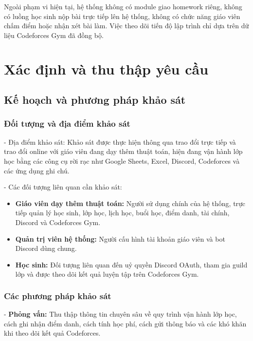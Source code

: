 \documentclass[12pt,a4paper]{article}
\begin{document}
Ngoài phạm vi hiện tại, hệ thống không có module giao homework riêng, không có luồng học sinh nộp bài trực tiếp lên hệ thống, không có chức năng giáo viên chấm điểm hoặc nhận xét bài làm. Việc theo dõi tiến độ lập trình chỉ dựa trên dữ liệu Codeforces Gym đã đồng bộ.

\section{Xác định và thu thập yêu cầu}

\subsection{Kế hoạch và phương pháp khảo sát}

\subsubsection{Đối tượng và địa điểm khảo sát}

- Địa điểm khảo sát: Khảo sát được thực hiện thông qua trao đổi trực tiếp và
trao đổi online với giáo viên đang dạy thêm thuật toán, hiện đang vận hành lớp
học bằng các công cụ rời rạc như Google Sheets, Excel, Discord, Codeforces và
các ứng dụng ghi chú.

- Các đối tượng liên quan cần khảo sát:

\begin{itemize}[leftmargin=*]
\item \textbf{Giáo viên dạy thêm thuật toán:} Người sử dụng chính của hệ thống, trực tiếp quản lý học sinh, lớp học, lịch học, buổi học, điểm danh, tài chính, Discord và Codeforces Gym.
\item \textbf{Quản trị viên hệ thống:} Người cấu hình tài khoản giáo viên và bot Discord dùng chung.
\item \textbf{Học sinh:} Đối tượng liên quan đến uỷ quyền Discord OAuth, tham gia guild lớp và được theo dõi kết quả luyện tập trên Codeforces Gym.
\end{itemize}

\subsubsection{Các phương pháp khảo sát}

- \textbf{Phỏng vấn:} Thu thập thông tin chuyên sâu về quy trình vận hành lớp
học, cách ghi nhận điểm danh, cách tính học phí, cách gửi thông báo và các khó
khăn khi theo dõi kết quả Codeforces.
\end{document}
